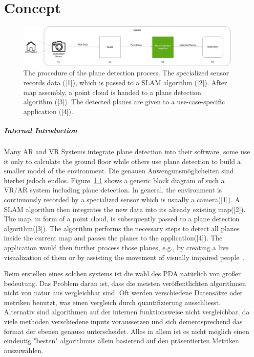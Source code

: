 \documentclass[main.tex]{subfiles}
\begin{document}
\chapter{Concept} \label{chap:Concept}


\begin{figure}[H]
    \centering
    \includegraphics[width=15 cm]{images/concept_specific.png}
    \caption[Concrete Concept Graphic]{The procedure of the plane detection process. The specialized sensor records data ([1]), which is passed to
        a SLAM algorithm ([2]). After map assembly, a point cloud is handed to a plane detection algorithm ([3]).
        The detected planes are given to a use-case-specific application ([4]).}
    \label{fig:concept}
\end{figure}

\paragraph*{Internal Introduction}
Many AR and VR Systems integrate plane detection into their software, some use it only to calculate the ground floor while others use plane detection to
build a smaller model of the environment. Die genauen Anwengunsmöglicheiten sind hierbei jedoch endlos.
Figure~\ref{fig:concept} shows a generic block diagram of such a VR/AR system including plane detection.
In general, the environment is continuously recorded by a specialized sensor which is usually a camera([1]). A SLAM algorithm then integrates the new data into its already existing map([2]). The map, in form of a point cloud,
is subsequently passed to a plane detection algorithm([3]). The algorithm performs the necessary steps to detect all planes inside the current map and passes the planes to the application([4]).
The application would then further process those planes, e.g., by creating a live visualization of them or by assisting the movement of visually impaired people~\cite{Carranza_Estrella_Zaidi_Carranza_2021}.

Beim erstellen eines solchen systems ist die wahl des PDA natürlich von großer bedeutung. Das Problem daran ist, dass die meisten veröffentlichten algorithmen nicht von natur aus
vergleichbar sind. Oft werden verschiedene Datensätze oder metriken benutzt, was einen vergleich durch quantifizierung ausschliesst. Alternativ sind algorithmen auf der internen funktionsweise nicht vergleichbar,
da viele methoden verschiedene inputs voraussetzen und sich dementsprechend das format der ebenen genauso unterscheidet. Alles in allem ist es nicht möglich einen eindeutig "besten" algorithmus allein
basierend auf den präsentierten Metriken auszuwählen.
\end{document}
